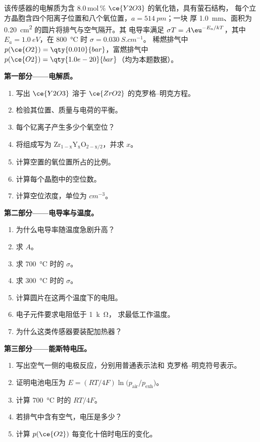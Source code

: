 \begin{problem}
\label{pb:b3:solid-state:1}
该传感器的电解质为含 8.0\,mol\,\% $\ce{Y2O3}$ 的氧化锆，具有萤石结构，
每个立方晶胞含四个阳离子位置和八个氧位置，$a = \qty{514}{pm}$；一块
厚 \qty{1.0}{mm}、面积为 \qty{0.20}{cm^2} 的圆片将排气与空气隔开。其
电导率满足 $\sigma T = A\eu^{-E_a/kT}$，其中 $E_a = \qty{1.0}{eV}$，在 \qty{800}{\celsius} 时 $\sigma = \qty{0.030}{S.cm^{-1}}$。
稀燃排气中 $p(\ce{O2}) = \qty{0.010}{bar}$，富燃排气中 $p(\ce{O2}) = \qty{1.0e-20}{bar}$（均为本题数据）。

\medskip\noindent\textbf{第一部分——电解质。}
\begin{enumerate}
  \item 写出 $\ce{Y2O3}$ 溶于 $\ce{ZrO2}$ 的克罗格–明克方程。
  \item 检验其位置、质量与电荷的平衡。
  \item 每个钇离子产生多少个氧空位？
  \item 将组成写为 $\mathrm{Zr_{1-x}Y_xO_{2-x/2}}$，并求 $x$。
  \item 计算空置的氧位置所占的比例。
  \item 计算每个晶胞中的空位数。
  \item 计算空位浓度，单位为 $\unit{cm^{-3}}$。
\end{enumerate}

\medskip\noindent\textbf{第二部分——电导率与温度。}
\begin{enumerate}[resume]
  \item 为什么电导率随温度急剧升高？
  \item 求 $A$。
  \item 求 \qty{700}{\celsius} 时的 $\sigma$。
  \item 求 \qty{300}{\celsius} 时的 $\sigma$。
  \item 计算圆片在这两个温度下的电阻。
  \item 电子元件要求电阻低于 \qty{1}{k\ohm}，
        求最低工作温度。
  \item 为什么这类传感器要装配加热器？
\end{enumerate}

\medskip\noindent\textbf{第三部分——能斯特电压。}
\begin{enumerate}[resume]
  \item 写出空气一侧的电极反应，分别用普通表示法和
        克罗格–明克符号表示。
  \item 证明电池电压为 $E = (RT/4F)\ln\bigl(p_{\mathrm{air}}/p_{\mathrm{exh}}\bigr)$。
  \item 计算 \qty{700}{\celsius} 时的 $RT/4F$。
  \item 若排气中含有空气，电压是多少？
  \item 计算 $p(\ce{O2})$ 每变化十倍时电压的变化。
\end{enumerate}


\end{problem}
